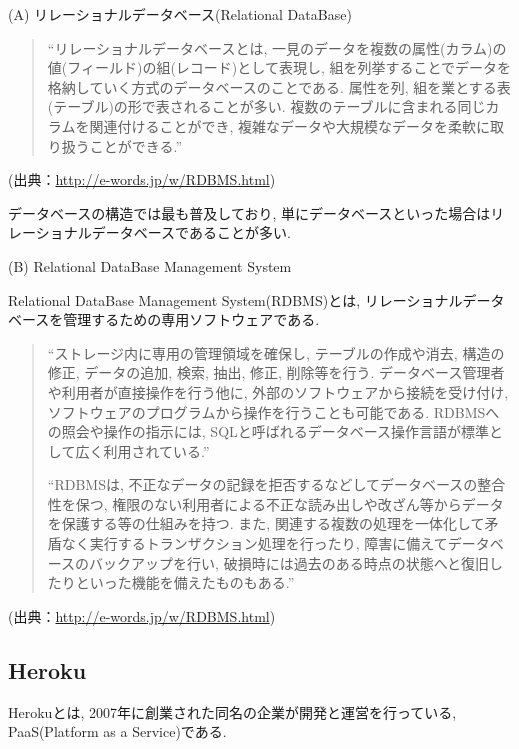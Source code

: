 \begin{description}
\item (A) リレーショナルデータベース(Relational DataBase)

\begin{quotation}
“リレーショナルデータベースとは, 一見のデータを複数の属性(カラム)の値(フィールド)の組(レコード)として表現し, 組を列挙することでデータを格納していく方式のデータベースのことである.
属性を列, 組を業とする表(テーブル)の形で表されることが多い.
複数のテーブルに含まれる同じカラムを関連付けることができ, 複雑なデータや大規模なデータを柔軟に取り扱うことができる.”
\end{quotation}
\begin{flushright}
(出典：\url{http://e-words.jp/w/RDBMS.html})
\end{flushright}

データベースの構造では最も普及しており, 単にデータベースといった場合はリレーショナルデータベースであることが多い.

\item (B) Relational DataBase Management System

Relational DataBase Management System(RDBMS)とは, リレーショナルデータベースを管理するための専用ソフトウェアである.

\begin{quotation}
“ストレージ内に専用の管理領域を確保し, テーブルの作成や消去, 構造の修正, データの追加, 検索, 抽出, 修正, 削除等を行う.
データベース管理者や利用者が直接操作を行う他に, 外部のソフトウェアから接続を受け付け, ソフトウェアのプログラムから操作を行うことも可能である.
RDBMSへの照会や操作の指示には, SQLと呼ばれるデータベース操作言語が標準として広く利用されている.”

“RDBMSは, 不正なデータの記録を拒否するなどしてデータベースの整合性を保つ, 権限のない利用者による不正な読み出しや改ざん等からデータを保護する等の仕組みを持つ.
また, 関連する複数の処理を一体化して矛盾なく実行するトランザクション処理を行ったり, 障害に備えてデータベースのバックアップを行い, 破損時には過去のある時点の状態へと復旧したりといった機能を備えたものもある.”
\end{quotation}
\begin{flushright}
(出典：\url{http://e-words.jp/w/RDBMS.html})
\end{flushright}

\end{description}

\subsection{Heroku}
Herokuとは, 2007年に創業された同名の企業が開発と運営を行っている, PaaS(Platform as a Service)である.

